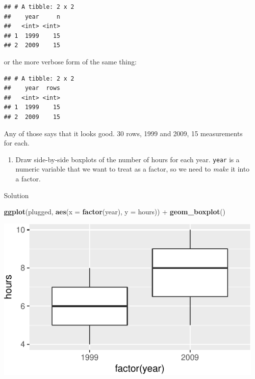 \documentclass[]{tufte-book}
\newenvironment{Shaded}{}{}
\newcommand{\DataTypeTok}[1]{\textcolor[rgb]{0.56,0.13,0.00}{#1}}
\newcommand{\KeywordTok}[1]{\textcolor[rgb]{0.00,0.44,0.13}{\textbf{#1}}}
\newcommand{\NormalTok}[1]{#1}
\newcommand{\OperatorTok}[1]{\textcolor[rgb]{0.40,0.40,0.40}{#1}}
\newcommand{\StringTok}[1]{\textcolor[rgb]{0.25,0.44,0.63}{#1}}
\providecommand{\tightlist}{%
  \setlength{\itemsep}{0pt}\setlength{\parskip}{0pt}}
\theoremstyle{definition}
\theoremstyle{definition}
\theoremstyle{definition}
\theoremstyle{remark}
\begin{document}
\begin{verbatim}
## # A tibble: 2 x 2
##    year     n
##   <int> <int>
## 1  1999    15
## 2  2009    15
\end{verbatim}

or the more verbose form of the same thing:

\begin{Shaded}
\end{Shaded}

\begin{verbatim}
## # A tibble: 2 x 2
##    year  rows
##   <int> <int>
## 1  1999    15
## 2  2009    15
\end{verbatim}

Any of those says that it looks good. 30 rows, 1999 and 2009, 15
measurements for each.

\begin{enumerate}
\def\labelenumi{(\alph{enumi})}
\setcounter{enumi}{1}
\tightlist
\item
  Draw side-by-side boxplots of the number of hours for each year.
  \texttt{year} is a numeric variable that we want to treat as a factor,
  so we need to \emph{make} it into a factor.
\end{enumerate}

Solution

\begin{Shaded}
\begin{Highlighting}[]
\KeywordTok{ggplot}\NormalTok{(plugged, }\KeywordTok{aes}\NormalTok{(}\DataTypeTok{x =} \KeywordTok{factor}\NormalTok{(year), }\DataTypeTok{y =}\NormalTok{ hours)) }\OperatorTok{+}\StringTok{ }
\StringTok{    }\KeywordTok{geom_boxplot}\NormalTok{()}
\end{Highlighting}
\end{Shaded}

\includegraphics{05-two-sample-inference_files/figure-latex/unnamed-chunk-5-1}
\end{document}
